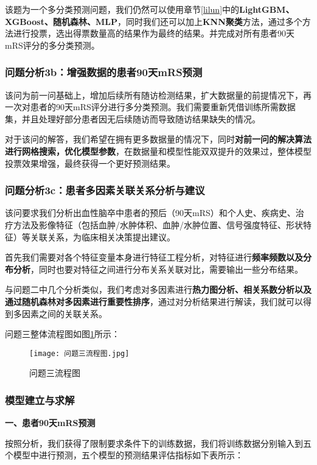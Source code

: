 \documentclass[bwprint]{gmcmthesis}
\begin{document}
				该题为一个多分类预测问题，我们仍然可以使用章节\ref{lilun}中的\textbf{LightGBM、XGBoost、随机森林、MLP}，同时我们还可以加上\textbf{KNN聚类}方法，通过多个方法进行投票，选出得票数量高的结果作为最终的结果。并完成对所有患者90天mRS评分的多分类预测。
				
			\subsubsection{问题分析3b：增强数据的患者90天mRS预测}
				该问为前一问基础上，增加后续所有随访检测结果，扩大数据量的前提情况下，再一次对患者的90天mRS评分进行多分类预测。我们需要重新凭借训练所需数据集，并且处理好部分患者因无后续随访而导致随访结果缺失的情况。
			
				对于该问的解答，我们希望在拥有更多数据量的情况下，同时\textbf{对前一问的解决算法进行网格搜索，优化模型参数}，在数据量和模型性能双双提升的效果过，整体模型投票效果增强，最终获得一个更好预测结果。
			
			\subsubsection{问题分析3c：患者多因素关联关系分析与建议}
				该问要求我们分析出血性脑卒中患者的预后（90天mRS）和个人史、疾病史、治疗方法及影像特征（包括血肿/水肿体积、血肿/水肿位置、信号强度特征、形状特征）等关联关系，为临床相关决策提出建议。
				
				首先我们需要对各个特征变量本身进行特征工程分析，对特征进行\textbf{频率频数以及分布分析}，同时也要对特征之间进行分布关系关联对比，需要输出一些分布结果。
				
				与问题二中几个分析类似，我们考虑对多因素进行\textbf{热力图分析、相关系数分析以及通过随机森林对多因素进行重要性排序}，通过对分析结果进行解读，我们就可以得到多因素之间的关联关系。
				
				问题三整体流程图如图\ref{fig:17}所示：
				
				\begin{figure}[H]
					\centering
					\texttt{[image: 问题三流程图.jpg]}
					\caption{问题三流程图}
					\label{fig:17}
				\end{figure}
			
			\subsubsection{模型建立与求解}
				\textbf{一、患者90天mRS预测}

				按照分析，我们获得了限制要求条件下的训练数据，我们将训练数据分别输入到五个模型中进行预测，五个模型的预测结果评估指标如下表所示：
				
\end{document}
